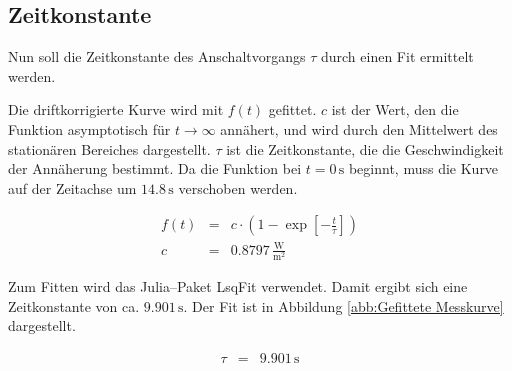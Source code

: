 \documentclass[12pt,a4paper]{scrartcl}
\numberwithin{equation}{section} %
\newcommand{\code}[1]{\textsf{#1}}
\begin{document}
\subsection{Zeitkonstante}
\label{Zeitkonstante}
Nun soll die Zeitkonstante des Anschaltvorgangs $\tau$ durch einen Fit ermittelt werden.

Die driftkorrigierte Kurve wird mit $f(t)$ gefittet. $c$ ist der Wert, den die Funktion asymptotisch für $t \rightarrow \infty$ annähert, und wird durch den Mittelwert des stationären Bereiches dargestellt. $\tau $ ist die Zeitkonstante, die die Geschwindigkeit der Annäherung bestimmt. Da die Funktion bei $t=0\mathrm{\,s}$ beginnt, muss die Kurve auf der Zeitachse um $14.8\mathrm{\,s}$ verschoben werden.

\begin{eqnarray}
  f(t) &=& c \cdot \left(
  1 - \exp[-\frac{t}{\tau}]
  \right)
  \label{eq:Drift Fit} \\
  c &=& 0.8797 \mathrm{\,\frac{W}{m^2}}
\end{eqnarray}

\noindent
Zum Fitten wird das \code{Julia}--Paket \code{LsqFit} \cite{Julia:LsqFit} verwendet. Damit ergibt sich eine Zeitkonstante von ca. $9.901 \mathrm{\,s}$. Der Fit ist in Abbildung \ref{abb:Gefittete Messkurve} dargestellt.

\begin{eqnarray}
  \tau &=& 9.901 \mathrm{\,s}
\end{eqnarray}
\end{document}
